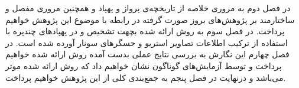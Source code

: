 در فصل دوم به مروری خلاصه از تاریخچه‌ی پرواز و پهپاد و همچنین مروری مفصل و ساختارمند بر پژوهش‌های بروز صورت گرفته در رابطه با موضوع این پژوهش خواهیم پرداخت. در فصل سوم به روش ارائه شده بچهت تشخیص و  در پهپادهای چندپره با استفاده از ترکیب اطلاعات تصاویر استریو و حسگرهای سونار آورده شده است. در فصل چهارم این نگارش به بررسی نتایج عملی بدست آمده روش ارائه شده خواهیم پرداخت و توسط آزمایش‌های گوناگون نشان خواهیم داد که روش ارائه شده موثر می‌باشد و درنهایت در فصل پنجم به جمع‌بندی کلی از این پژوهش خواهیم پرداخت.